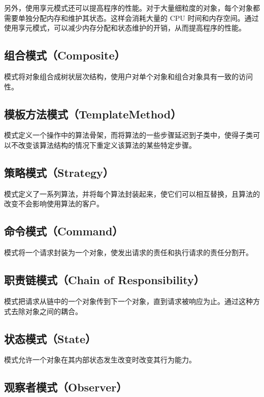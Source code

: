 \documentclass[cn,black,12pt,normal]{elegantnote}
\begin{document}
另外，使用享元模式还可以提高程序的性能。对于大量细粒度的对象，每个对象都需要单独分配内存和维护其状态。这样会消耗大量的 CPU 时间和内存空间。通过使用享元模式，可以减少内存分配和状态维护的开销，从而提高程序的性能。


\subsection{组合模式（Composite）}

模式将对象组合成树状层次结构，使用户对单个对象和组合对象具有一致的访问性。

\subsection{模板方法模式（TemplateMethod）}

模式定义一个操作中的算法骨架，而将算法的一些步骤延迟到子类中，使得子类可以不改变该算法结构的情况下重定义该算法的某些特定步骤。

\subsection{策略模式（Strategy）}

模式定义了一系列算法，并将每个算法封装起来，使它们可以相互替换，且算法的改变不会影响使用算法的客户。

\subsection{命令模式（Command）}

模式将一个请求封装为一个对象，使发出请求的责任和执行请求的责任分割开。

\subsection{职责链模式（Chain of Responsibility）}

模式把请求从链中的一个对象传到下一个对象，直到请求被响应为止。通过这种方式去除对象之间的耦合。

\subsection{状态模式（State）}

模式允许一个对象在其内部状态发生改变时改变其行为能力。

\subsection{观察者模式（Observer）}
\end{document}
